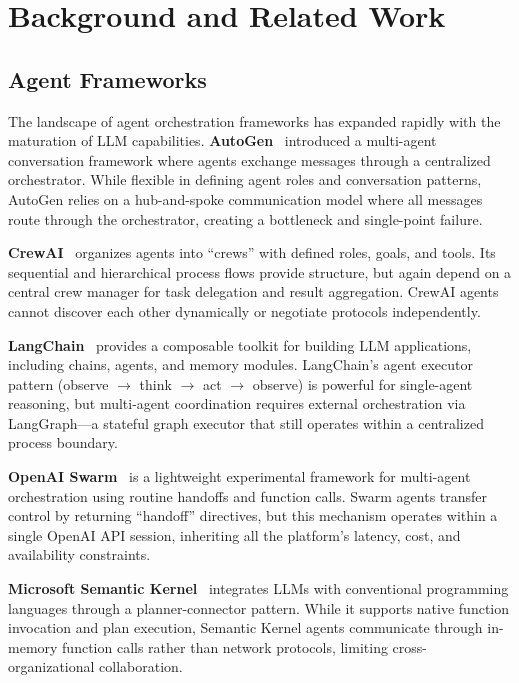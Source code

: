 \section{Background and Related Work}

\subsection{Agent Frameworks}

The landscape of agent orchestration frameworks has expanded rapidly with the maturation of LLM capabilities. \textbf{AutoGen}~\cite{wu2023autogen} introduced a multi-agent conversation framework where agents exchange messages through a centralized orchestrator. While flexible in defining agent roles and conversation patterns, AutoGen relies on a hub-and-spoke communication model where all messages route through the orchestrator, creating a bottleneck and single-point failure.

\textbf{CrewAI}~\cite{crewai2024} organizes agents into ``crews'' with defined roles, goals, and tools. Its sequential and hierarchical process flows provide structure, but again depend on a central crew manager for task delegation and result aggregation. CrewAI agents cannot discover each other dynamically or negotiate protocols independently.

\textbf{LangChain}~\cite{chase2022langchain} provides a composable toolkit for building LLM applications, including chains, agents, and memory modules. LangChain's agent executor pattern (observe $\rightarrow$ think $\rightarrow$ act $\rightarrow$ observe) is powerful for single-agent reasoning, but multi-agent coordination requires external orchestration via LangGraph---a stateful graph executor that still operates within a centralized process boundary.

\textbf{OpenAI Swarm}~\cite{openai2024swarm} is a lightweight experimental framework for multi-agent orchestration using routine handoffs and function calls. Swarm agents transfer control by returning ``handoff'' directives, but this mechanism operates within a single OpenAI API session, inheriting all the platform's latency, cost, and availability constraints.

\textbf{Microsoft Semantic Kernel}~\cite{microsoft2023semantickernel} integrates LLMs with conventional programming languages through a planner-connector pattern. While it supports native function invocation and plan execution, Semantic Kernel agents communicate through in-memory function calls rather than network protocols, limiting cross-organizational collaboration.

